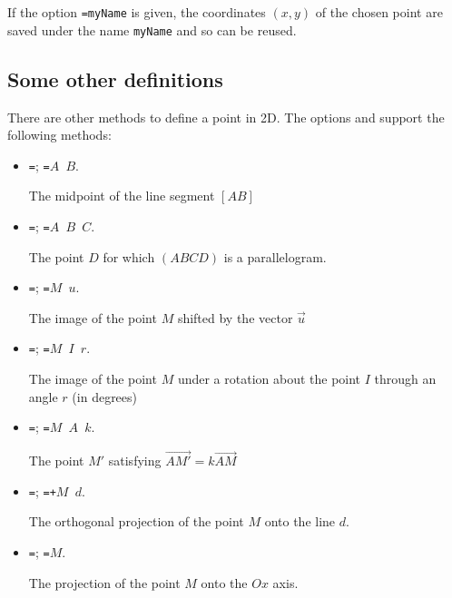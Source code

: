 If the option \texttt{=myName} is given, the coordinates
$(x,y)$ of the chosen point are saved under the name \texttt{myName} and so
can be reused.

\subsection{Some other definitions}

There are other methods to define a point in 2D. The options
 and  support the following
methods:

\begin{itemize}

\item \texttt{=};
\texttt{=$A$ $B$}.

The midpoint of the line segment $[AB]$

\item \texttt{=};
\texttt{=$A$ $B$ $C$}.

The point $D$ for which $(ABCD)$ is a
parallelogram.

\item \texttt{=};
\texttt{=$M$ $u$}.

The image of the point $M$ shifted by the vector
$\vec u$


\item \texttt{=};
\texttt{=$M$ $I$ $r$}.

The image of the point $M$ under a
rotation about the point $I$ through an angle $r$ (in degrees)

\item \texttt{=};
\texttt{=$M$ $A$ $k$}.

The point $M'$ satisfying
$\overrightarrow {AM'} = k \overrightarrow {AM}$

\item \texttt{=};
\texttt{=+$M$ $d$}.

The orthogonal projection of the point
$M$ onto the line $d$.

\item \texttt{=};
\texttt{=$M$}.

The projection of the point $M$ onto the $Ox$
axis.


\end{itemize}
